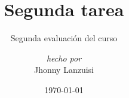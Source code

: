 \documentclass{scrartcl}
\begin{document}
%
\title{Segunda tarea}
\subtitle{Segunda evaluación del curso}
\subject{Análisis III}
\titlehead{Universidad Simón Bolívar\hfill Caracas, Venezuela}
\author{\textit{\large hecho por} \\ Jhonny Lanzuisi}
\date{\today}
\maketitle


\end{document}
